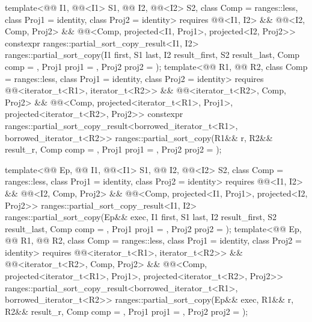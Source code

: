 \begin{itemdecl}
template<@@ I1, @@<I1> S1, @@ I2, @@<I2> S2,
         class Comp = ranges::less, class Proj1 = identity, class Proj2 = identity>
  requires @@<I1, I2> && @@<I2, Comp, Proj2> &&
           @@<Comp, projected<I1, Proj1>, projected<I2, Proj2>>
  constexpr ranges::partial_sort_copy_result<I1, I2>
    ranges::partial_sort_copy(I1 first, S1 last, I2 result_first, S2 result_last,
                              Comp comp = {}, Proj1 proj1 = {}, Proj2 proj2 = {});
template<@@ R1, @@ R2, class Comp = ranges::less,
         class Proj1 = identity, class Proj2 = identity>
  requires @@<iterator_t<R1>, iterator_t<R2>> &&
           @@<iterator_t<R2>, Comp, Proj2> &&
           @@<Comp, projected<iterator_t<R1>, Proj1>,
                                      projected<iterator_t<R2>, Proj2>>
  constexpr ranges::partial_sort_copy_result<borrowed_iterator_t<R1>, borrowed_iterator_t<R2>>
    ranges::partial_sort_copy(R1&& r, R2&& result_r, Comp comp = {},
                              Proj1 proj1 = {}, Proj2 proj2 = {});

template<@@ Ep, @@ I1, @@<I1> S1,
         @@ I2, @@<I2> S2,
         class Comp = ranges::less, class Proj1 = identity, class Proj2 = identity>
  requires @@<I1, I2> && @@<I2, Comp, Proj2> &&
            @@<Comp, projected<I1, Proj1>, projected<I2, Proj2>>
  ranges::partial_sort_copy_result<I1, I2>
    ranges::partial_sort_copy(Ep&& exec, I1 first, S1 last, I2 result_first, S2 result_last,
                              Comp comp = {}, Proj1 proj1 = {},
                              Proj2 proj2 = {});
template<@@ Ep, @@ R1, @@ R2,
         class Comp = ranges::less, class Proj1 = identity, class Proj2 = identity>
  requires @@<iterator_t<R1>, iterator_t<R2>> &&
           @@<iterator_t<R2>, Comp, Proj2> &&
           @@<Comp, projected<iterator_t<R1>, Proj1>,
                                      projected<iterator_t<R2>, Proj2>>
  ranges::partial_sort_copy_result<borrowed_iterator_t<R1>, borrowed_iterator_t<R2>>
    ranges::partial_sort_copy(Ep&& exec, R1&& r, R2&& result_r, Comp comp = {},
                              Proj1 proj1 = {}, Proj2 proj2 = {});
\end{itemdecl}

